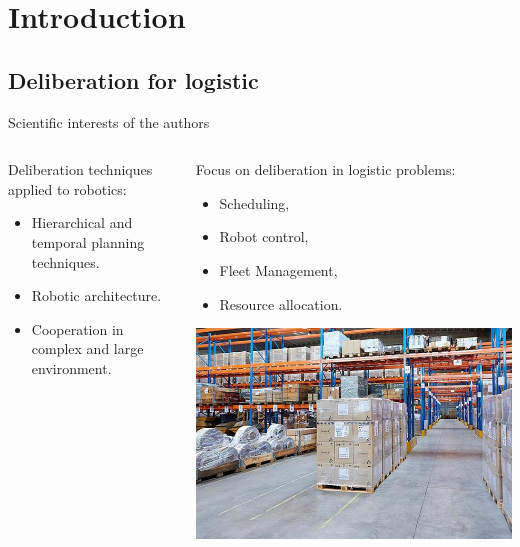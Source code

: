 \section{Introduction}
\subsection{Deliberation for logistic}

\begin{frame}{Scientific interests of the authors}
    \centering
\begin{columns}
    \begin{column}{0.5\textwidth}
        Deliberation techniques applied to robotics:
        \begin{itemize}
            \item Hierarchical and temporal planning techniques.
            \item Robotic architecture.
            \item Cooperation in complex and large environment.
        \end{itemize}
    \end{column}
    \begin{column}{0.5\textwidth}
        Focus on deliberation in logistic problems: 
        \begin{itemize}
            \item Scheduling,
            \item Robot control,
            \item Fleet Management,
            \item Resource allocation.
        \end{itemize}
        \includegraphics[width = \textwidth]{images/logisticsolutions.jpg}
    \end{column}
\end{columns}

\end{frame}


